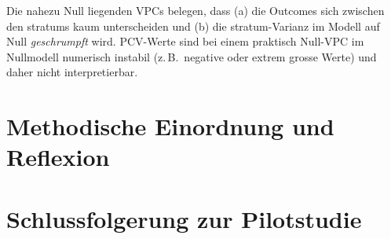 Die nahezu Null liegenden VPCs belegen, dass (a) die Outcomes sich zwischen den \glspl{stratum} kaum unterscheiden und (b) die \gls{stratum}-Varianz im Modell auf Null \emph{geschrumpft} wird. PCV-Werte sind bei einem praktisch Null-VPC im Nullmodell numerisch instabil (z.\,B.\ negative oder extrem grosse Werte) und daher nicht interpretierbar.

\section{Methodische Einordnung und Reflexion}

\section{Schlussfolgerung zur Pilotstudie}






